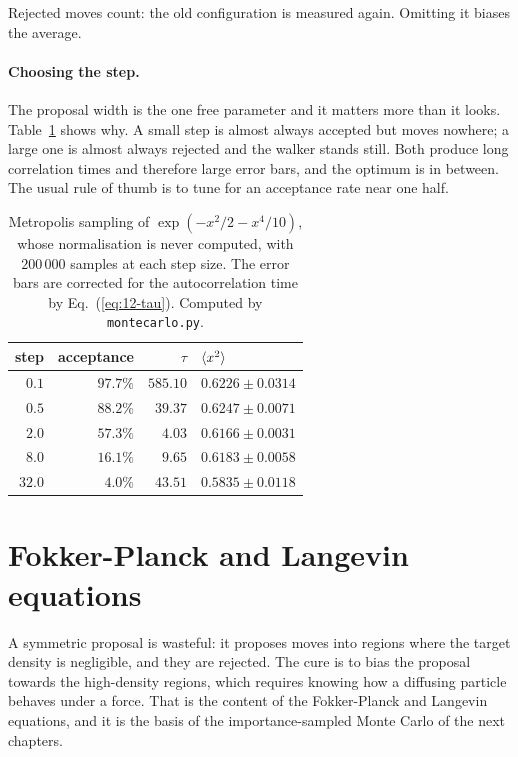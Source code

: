 \noindent
Rejected moves count: the old configuration is measured again.  Omitting it
biases the average.

\paragraph{Choosing the step.}
The proposal width is the one free parameter and it matters more than it
looks.  Table~\ref{tab:12-step} shows why.  A small step is almost always
accepted but moves nowhere; a large one is almost always rejected and the
walker stands still.  Both produce long correlation times and therefore large
error bars, and the optimum is in between.  The usual rule of thumb is to tune
for an acceptance rate near one half.

\begin{table}[h]
\centering
\renewcommand{\arraystretch}{1.25}
\setlength{\tabcolsep}{12pt}
\begin{tabular}{rrrl}
\toprule
step & acceptance & $\tau$ & $\langle x^2 \rangle$\\
\midrule
$0.1$  & $97.7\%$ & $585.10$ & $0.6226\pm0.0314$\\
$0.5$  & $88.2\%$ & $\phantom{0}39.37$ & $0.6247\pm0.0071$\\
$2.0$  & $57.3\%$ & $\phantom{00}4.03$ & $0.6166\pm0.0031$\\
$8.0$  & $16.1\%$ & $\phantom{00}9.65$ & $0.6183\pm0.0058$\\
$32.0$ & $\phantom{0}4.0\%$ & $\phantom{0}43.51$ & $0.5835\pm0.0118$\\
\bottomrule
\end{tabular}
\caption{Metropolis sampling of $\exp(-x^2/2-x^4/10)$, whose normalisation is
never computed, with $200\,000$ samples at each step size.  The error bars are
corrected for the autocorrelation time by Eq.~(\ref{eq:12-tau}).  Computed by
\texttt{montecarlo.py}.}
\label{tab:12-step}
\end{table}

\section{Fokker-Planck and Langevin equations}
\label{sec:fokkerplanck}

A symmetric proposal is wasteful: it proposes moves into regions where the
target density is negligible, and they are rejected.  The cure is to bias the
proposal towards the high-density regions, which requires knowing how a
diffusing particle behaves under a force.  That is the content of the
Fokker-Planck and Langevin equations, and it is the basis of the
importance-sampled Monte Carlo of the next chapters.


